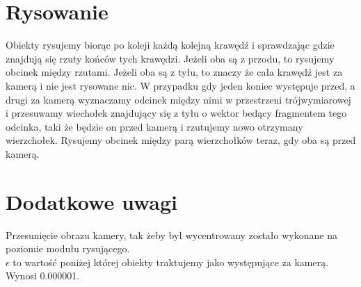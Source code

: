 \documentclass[a4paper,11pt]{article}
\begin{document}
\section{Rysowanie}
Obiekty rysujemy biorąc po koleji każdą kolejną krawędź i 
sprawdzając gdzie znajdują się rzuty końców tych krawędzi.
Jeżeli oba są z przodu, to rysujemy obcinek między rzutami. 
Jeżeli oba są z tyłu, to znaczy że cała krawędź jest za kamerą 
i nie jest rysowane nic. W przypadku gdy jeden koniec występuje 
przed, a drugi za kamerą wyznaczamy odcinek między nimi w przestrzeni 
trójwymiarowej i przesuwamy wiechołek znajdujący się z tyłu o wektor 
bedący fragmentem tego odcinka, taki że będzie on przed kamerą i 
rzutujemy nowo otrzymany wierzchołek. Rysujemy obcinek między parą 
wierzchołków teraz, gdy oba są przed kamerą.

\section{Dodatkowe uwagi}
Przesunięcie obrazu kamery, tak żeby był wycentrowany zostało 
wykonane na poziomie modułu rysującego. \\
\(\epsilon\) to wartość poniżej której obiekty traktujemy jako 
występujące za kamerą. Wynosi 0.000001.
\end{document}
